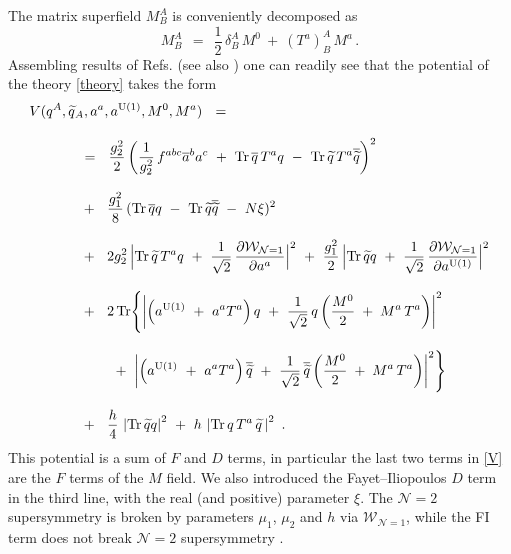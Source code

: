 \documentclass[12pt]{article}
\def\Tr{{\rm Tr}}
\newcommand{\ntwo}{${\mathcal N}=2$ }
\newcommand{\p}{\partial}
\newcommand{\wt}{\widetilde}
\newcommand{\ov}{\overline}
\newcommand{\mc}[1]{\mathcal{#1}}
\newcommand{\aU}{a^{\rm U(1)}}
\begin{document}
	The matrix superfield $ M^A_B $ is conveniently decomposed as 
\[
	M^A_B ~~=~~ \frac{1}{2}\,\delta^A_B\, M^0  ~+~ (T^a)^A_B\, M^a\,.
\]
Assembling results of Refs. \cite{SYhet,GSYmmodel} (see also \cite{SYrev}) one can readily see that the  potential of the theory \eqref{theory} takes the form
\begin{align}
%
\notag
	& V(q^A, \wt{q}{}_A, a^a, \aU, M^0, M^a) ~~=~~ 
	\\[3mm]
%
\notag
	&\qquad\quad ~~=~~
			\frac{g_2^2}{2} \left( \frac{1}{g_2^2}\,f^{abc}\ov{a}{}^b a^c 
				~+~ \Tr\, \ov{q}\, T^a q 
				~-~ \Tr\, \wt{q}\, T^a \ov{\wt{q}} \right)^2 
	\\[3mm]
%
\label{V}
	&\qquad\quad ~~+~~
		\frac{g_1^2}{8}\, (\Tr\, \ov{q} q ~-~ \Tr\, \wt{q} \ov{\wt{q}} ~-~ N\xi )^2
	\\[3mm]
%
\notag
	&\qquad\quad ~~+~~
		2g_2^2\, \Bigl| \Tr\, \wt{q}\,T^a q ~+~ 
			\frac{1}{\sqrt{2}}\, \frac{\p\mc{W}_{\mc{N}=1}}{\p a^a} \Bigr|^2
	~+~
	\frac{g_1^2}{2}\, \Bigl| \Tr\, \wt{q} q ~+~ 
			\frac{1}{\sqrt{2}}\, \frac{\p\mc{W}_{\mc{N}=1}}{\p\aU} \Bigr|^2
	\\[3mm]
%
\notag
	&\qquad\quad ~~+~~
	2\, \Tr \Biggl\{  
		\left| \left( \aU ~+~ a^a T^a \right) q ~+~
			\frac{1}{\sqrt{2}}\, q\left( \frac{M^0}{2} \;+\; M^a\,T^a \right) \right|^2 
	\\[3mm]
%
\notag
	&\phantom{\qquad\quad ~~+~~ 2 } ~+~
		\left| \left( \aU ~+~ a^a T^a \right) \ov{\wt{q}} ~+~
			\frac{1}{\sqrt{2}}\, \ov{\wt{q}}\left( \frac{M^0}{2} \;+\; M^a\,T^a \right) \right|^2 
			\Biggr\}
	\\[3mm]
%
\notag
	&\qquad\quad ~~+~~
	\frac{h}{4}\, \left| \Tr\, \wt{q}q \right|^2  ~+~ h\,\left| \Tr\, q\,T^a\,\wt{q} \,\right|^2	
	~.
\end{align}
	This potential is a sum of $ F $ and $ D $ terms, in particular the last two terms in \eqref{V}
	are the $ F $ terms of the  $ M $ field.
	We also introduced the Fayet--Iliopoulos $ D $ term in the third line, with the real (and positive)
	parameter $ \xi $.
	The \ntwo supersymmetry is broken by parameters $ \mu_1 $, $ \mu_2 $ and $ h $ via $ \mc{W}_{\mc{N}=1} $, while
	the FI term does not break \ntwo supersymmetry \cite{HSZ,VY}.
\end{document}
